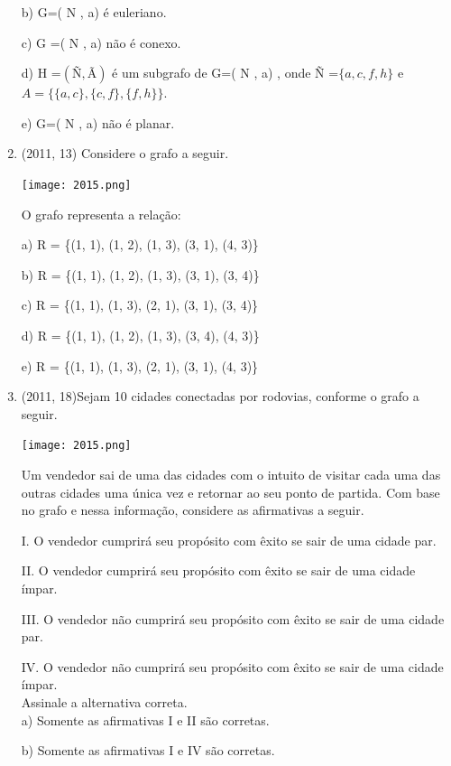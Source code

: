 \documentclass{article}
\begin{document}
\begin{enumerate}
b) G=( N , a) é euleriano.

c) G =( N , a) não é conexo.

d) H =$(Ñ, Ã )$ é um subgrafo de G=( N , a) , onde Ñ =$\{a , c , f , h \}$ e $A=\{\{a , c\}, \{c , f \}, \{ f , h\}\}$.

e) G=( N , a) não é planar.


\item(2011, 13) Considere o grafo a seguir.

\texttt{[image: 2015.png]}\newline


O grafo representa a relação:

a) R = \{(1, 1), (1, 2), (1, 3), (3, 1), (4, 3)\}

b) R = \{(1, 1), (1, 2), (1, 3), (3, 1), (3, 4)\}

c) R = \{(1, 1), (1, 3), (2, 1), (3, 1), (3, 4)\}

d) R = \{(1, 1), (1, 2), (1, 3), (3, 4), (4, 3)\}

e) R = \{(1, 1), (1, 3), (2, 1), (3, 1), (4, 3)\}\newline






\item(2011, 18)Sejam 10 cidades conectadas por rodovias, conforme o grafo a seguir.


\texttt{[image: 2015.png]}\newline

Um vendedor sai de uma das cidades com o intuito de visitar cada uma das outras cidades uma única vez
e retornar ao seu ponto de partida. Com base no grafo e nessa informação, considere as afirmativas a
seguir.

I. O vendedor cumprirá seu propósito com êxito se sair de uma cidade par.

II. O vendedor cumprirá seu propósito com êxito se sair de uma cidade ímpar.

III. O vendedor não cumprirá seu propósito com êxito se sair de uma cidade par.

IV. O vendedor não cumprirá seu propósito com êxito se sair de uma cidade ímpar.\\

Assinale a alternativa correta.\\

a) Somente as afirmativas I e II são corretas.

b) Somente as afirmativas I e IV são corretas.


\end{enumerate}
\end{document}

